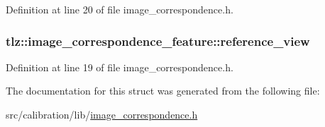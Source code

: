 Definition at line 20 of file image\+\_\+correspondence.\+h.

\subsubsection[{\texorpdfstring{reference\+\_\+view}{reference_view}}]{ tlz\+::image\+\_\+correspondence\+\_\+feature\+::reference\+\_\+view}\hypertarget{structtlz_1_1image__correspondence__feature_a425e2961c542652a66c6befdba6a03a5}{}\label{structtlz_1_1image__correspondence__feature_a425e2961c542652a66c6befdba6a03a5}


Definition at line 19 of file image\+\_\+correspondence.\+h.



The documentation for this struct was generated from the following file\+:\begin{DoxyCompactItemize}
\item 
src/calibration/lib/\hyperlink{image__correspondence_8h}{image\+\_\+correspondence.\+h}\end{DoxyCompactItemize}
